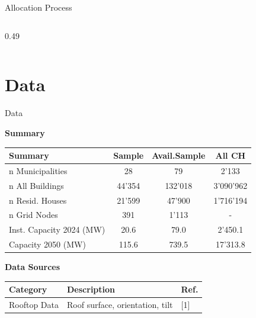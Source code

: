 \documentclass[10pt, aspectration=169]{beamer}
\begin{document}
\begin{frame}{Allocation Process}
\begin{columns}[t]
\begin{column}{0.49\textwidth}
\end{column}

\end{columns}
\end{frame}

\section{Data} 



\begin{frame}{Data}


\centering
\textbf{Summary}\\
\vspace{0.2cm}

{\scriptsize
\setlength{\tabcolsep}{3.5pt}
\renewcommand{\arraystretch}{1.15}

\begin{tabular}{|l c  c c |}
    \hline
    \textbf{Summary}      & \textbf{Sample}     & \textbf{Avail.Sample}        & \textbf{All CH} \\
    \hline
    n Municipalities        & 28    & 79        & 2'133    \\
    n All Buildings         & 44'354            & 132'018              & 3'090'962    \\
    n Resid. Houses         & 21'599             & 47'900               & 1'716'194    \\
    n Grid Nodes            & 391        & 1'113            & -    \\
    Inst. Capacity 2024 (MW) & 20.6  & 79.0    & 2'450.1 \\
    Capacity 2050 (MW)       & 115.6  & 739.5    & 17'313.8    \\
    \hline       
\end{tabular}

}

\vspace{0.6cm}

\centering
\textbf{Data Sources}\\
\vspace{0.2cm}

{\scriptsize
\setlength{\tabcolsep}{3.5pt}
\renewcommand{\arraystretch}{1.15}

\begin{tabular}{|l l l|} %
    \hline
    \textbf{Category} & \textbf{Description} & \textbf{Ref.} \\
    \hline
    Rooftop Data 
        & Roof surface, orientation, tilt
        & [1] \\
        

\end{tabular}}
\end{frame}
\end{document}
